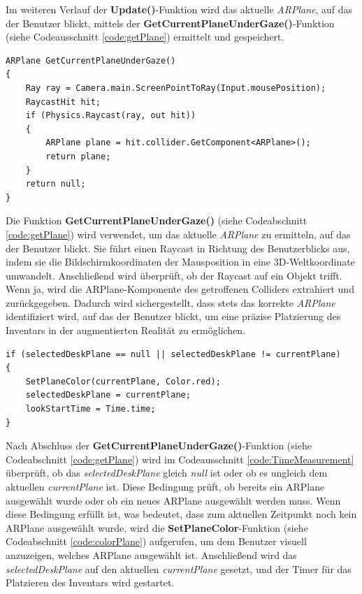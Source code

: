 Im weiteren Verlauf der \textbf{Update()}-Funktion wird das aktuelle \textit{ARPlane}, auf das der Benutzer blickt,
mittels der \textbf{GetCurrentPlaneUnderGaze()}-Funktion (siehe Codeausschnitt \ref{code:getPlane}) ermittelt und
gespeichert.

\begin{lstlisting}[style=csharp, caption={Das gewollte ARPlane ermitteln}, label=code:getPlane]
ARPlane GetCurrentPlaneUnderGaze()
{
    Ray ray = Camera.main.ScreenPointToRay(Input.mousePosition);
    RaycastHit hit;
    if (Physics.Raycast(ray, out hit))
    {
        ARPlane plane = hit.collider.GetComponent<ARPlane>();
        return plane;
    }
    return null;
}
\end{lstlisting}

Die Funktion \textbf{GetCurrentPlaneUnderGaze()} (siehe Codeabschnitt \ref{code:getPlane}) wird verwendet, um das aktuelle
\textit{ARPlane} zu ermitteln, auf das der Benutzer blickt. Sie führt einen Raycast in Richtung des Benutzerblicks aus,
indem sie die Bildschirmkoordinaten der Mausposition in eine 3D-Weltkoordinate umwandelt. Anschließend wird überprüft,
ob der Raycast auf ein Objekt trifft. Wenn ja, wird die ARPlane-Komponente des getroffenen Colliders extrahiert und
zurückgegeben. Dadurch wird sichergestellt, dass stets das korrekte \textit{ARPlane} identifiziert wird, auf das der
Benutzer blickt, um eine präzise Platzierung des Inventars in der augmentierten Realität zu ermöglichen.\\

\begin{lstlisting}[style=csharp, caption={Plane auswaehlen und timer starten}, label=code:TimeMeasurement]
if (selectedDeskPlane == null || selectedDeskPlane != currentPlane)
{
    SetPlaneColor(currentPlane, Color.red);
    selectedDeskPlane = currentPlane;
    lookStartTime = Time.time;
}
\end{lstlisting}
Nach Abschluss der \textbf{GetCurrentPlaneUnderGaze()}-Funktion (siehe Codeabschnitt \ref{code:getPlane}) wird im
Codeausschnitt \ref{code:TimeMeasurement} überprüft, ob das \textit{selectedDeskPlane} gleich \textit{null} ist oder ob
es ungleich dem aktuellen \textit{currentPlane} ist. Diese Bedingung prüft, ob bereits ein ARPlane ausgewählt wurde oder
ob ein neues ARPlane ausgewählt werden muss. Wenn diese Bedingung erfüllt ist, was bedeutet, dass zum aktuellen Zeitpunkt
noch kein ARPlane ausgewählt wurde, wird die \textbf{SetPlaneColor}-Funktion (siehe Codeabschnitt \ref{code:colorPlane})
aufgerufen, um dem Benutzer visuell anzuzeigen, welches ARPlane ausgewählt ist. Anschließend wird das \textit{selectedDeskPlane}
auf den aktuellen \textit{currentPlane} gesetzt, und der Timer für das Platzieren des Inventars wird gestartet.

